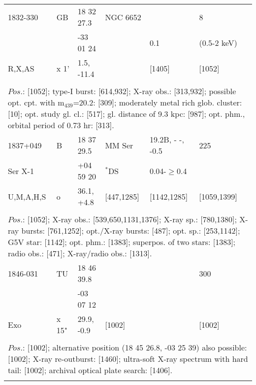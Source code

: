 \documentclass{aa}
\begin{document}
\begin{tabular}{p{2.5cm}p{1cm}p{1.8cm}p{2.3cm}p{3.3cm}p{2.0cm}p{2.2cm}}
\noalign{\smallskip}
1832-330     & GB         & 18 32 27.3         & NGC 6652           &                           & 8                         &          \\
                      &                & -33 01 24           &                                & 0.1                    & (0.5-2 keV)       &         \\
R,X,AS         & x 1'         & 1.5, -11.4           &                                & [1405]              & [1052]               &         \\
\\
\multicolumn{7}{p{17.5cm}}{
$Pos$.: [1052]; type-I burst: [614,932]; X-ray obs.: [313,932]; possible opt. cpt. with m$_{439}$=20.2: [309]; 
moderately metal rich glob. cluster: [10]; opt. study gl. cl.: [517]; gl. distance of 9.3 kpc: [987]; opt. phm., 
orbital period of 0.73 hr: [313].}\\
\noalign{\smallskip}
\hline

\noalign{\smallskip}
1837+049      & B            & 18 37 29.5            & MM Ser        & 19.2B, - -, -0.5         & 225                  &          \\
Ser X-1          &                & +04 59 20             & $^*$DS         & 0.04-$\geq$0.4       &                          &         \\
U,M,A,H,S     & o            & 36.1, +4.8              & [447,1285]    & [1142,1285]            & [1059,1399]     &         \\
\\
\multicolumn{7}{p{17.5cm}}{
$Pos$.: [1052]; X-ray obs.: [539,650,1131,1376]; X-ray sp.: [780,1380]; X-ray bursts: [761,1252]; opt./X-ray bursts: [487]; 
opt. sp.: [253,1142]; G5V star: [1142]; opt. phm.: [1383]; superpos. of two stars: 
[1383]; radio obs.: [471]; X-ray/radio obs.: [1313].}\\
\noalign{\smallskip}
\hline

\noalign{\smallskip}
1846-031       & TU           & 18 46 39.8           &                        &                             & 300                        &          \\
                        &                  & -03 07 12            &                         &                             &                                &         \\
Exo                 & x 15"       & 29.9, -0.9             & [1002]               &                             & [1002]                     &          \\
\\
\multicolumn{7}{p{17.5cm}}{
$Pos$.: [1002]; alternative position (18 45 26.8, -03 25 39) also possible: [1002]; X-ray re-outburst: [1460]; ultra-soft X-ray 
spectrum with hard tail: [1002]; archival optical plate search: [1406].}\\
\noalign{\smallskip}
\hline


\end{tabular}
\end{document}
